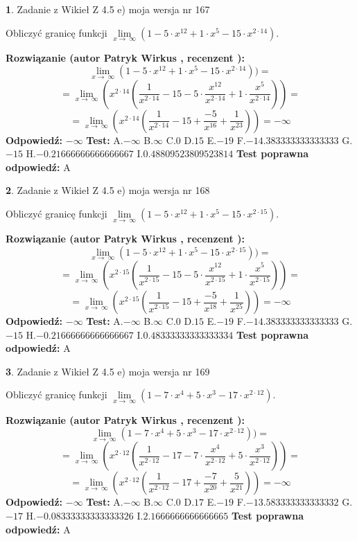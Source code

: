 \documentclass[12pt, a4paper]{article}
\theoremstyle{definition} %
\newtheorem{zad}{}
\newcommand{\zadStart}[1]{\begin{zad}#1\newline}
\newcommand{\zadStop}{\end{zad}}
\newcommand{\rozwStart}[2]{\noindent \textbf{Rozwiązanie (autor #1 , recenzent #2): }\newline}
\newcommand{\rozwStop}{\newline}
\newcommand{\odpStart}{\noindent \textbf{Odpowiedź:}\newline}
\newcommand{\odpStop}{\newline}
\newcommand{\testStart}{\noindent \textbf{Test:}\newline}
\newcommand{\testStop}{\newline}
\newcommand{\kluczStart}{\noindent \textbf{Test poprawna odpowiedź:}\newline}
\newcommand{\kluczStop}{\newline}
\begin{document}
\zadStart{Zadanie z Wikieł Z 4.5 e) moja wersja nr 167}


Obliczyć granicę funkcji  $\lim\limits_{x\to\ \infty}(1 - 5 \cdot x^{12}+1 \cdot x^{5}- 15 \cdot x^{2\cdot14})$.
\zadStop
\rozwStart{Patryk Wirkus}{}
$$\lim\limits_{x\to\ \infty}(1 - 5 \cdot x^{12}+1 \cdot x^{5}- 15 \cdot x^{2\cdot14}))=$$
$$=\lim\limits_{x\to\ \infty}(x^{2\cdot14}(\frac{1}{x^{2\cdot14}}-15 -5 \cdot \frac{x^{12}}{x^{2\cdot14}}+1 \cdot \frac{x^{5}}{x^{2\cdot14}}))=$$
$$=\lim\limits_{x\to\ \infty}(x^{2\cdot14}(\frac{1}{x^{2\cdot14}}-15 + \frac{-5}{x^{16}}+ \frac{1}{x^{23}}))=-\infty$$
\rozwStop
\odpStart
$-\infty$
\odpStop
\testStart
A.$-\infty$ B.$\infty$ C.$0$ D.$15$ E.$-19$
F.$-14.383333333333333$ G.$-15$
H.$-0.21666666666666667$
I.$0.48809523809523814$
\testStop
\kluczStart
A
\kluczStop



\zadStart{Zadanie z Wikieł Z 4.5 e) moja wersja nr 168}


Obliczyć granicę funkcji  $\lim\limits_{x\to\ \infty}(1 - 5 \cdot x^{12}+1 \cdot x^{5}- 15 \cdot x^{2\cdot15})$.
\zadStop
\rozwStart{Patryk Wirkus}{}
$$\lim\limits_{x\to\ \infty}(1 - 5 \cdot x^{12}+1 \cdot x^{5}- 15 \cdot x^{2\cdot15}))=$$
$$=\lim\limits_{x\to\ \infty}(x^{2\cdot15}(\frac{1}{x^{2\cdot15}}-15 -5 \cdot \frac{x^{12}}{x^{2\cdot15}}+1 \cdot \frac{x^{5}}{x^{2\cdot15}}))=$$
$$=\lim\limits_{x\to\ \infty}(x^{2\cdot15}(\frac{1}{x^{2\cdot15}}-15 + \frac{-5}{x^{18}}+ \frac{1}{x^{25}}))=-\infty$$
\rozwStop
\odpStart
$-\infty$
\odpStop
\testStart
A.$-\infty$ B.$\infty$ C.$0$ D.$15$ E.$-19$
F.$-14.383333333333333$ G.$-15$
H.$-0.21666666666666667$
I.$0.48333333333333334$
\testStop
\kluczStart
A
\kluczStop



\zadStart{Zadanie z Wikieł Z 4.5 e) moja wersja nr 169}


Obliczyć granicę funkcji  $\lim\limits_{x\to\ \infty}(1 - 7 \cdot x^{4}+5 \cdot x^{3}- 17 \cdot x^{2\cdot12})$.
\zadStop
\rozwStart{Patryk Wirkus}{}
$$\lim\limits_{x\to\ \infty}(1 - 7 \cdot x^{4}+5 \cdot x^{3}- 17 \cdot x^{2\cdot12}))=$$
$$=\lim\limits_{x\to\ \infty}(x^{2\cdot12}(\frac{1}{x^{2\cdot12}}-17 -7 \cdot \frac{x^{4}}{x^{2\cdot12}}+5 \cdot \frac{x^{3}}{x^{2\cdot12}}))=$$
$$=\lim\limits_{x\to\ \infty}(x^{2\cdot12}(\frac{1}{x^{2\cdot12}}-17 + \frac{-7}{x^{20}}+ \frac{5}{x^{21}}))=-\infty$$
\rozwStop
\odpStart
$-\infty$
\odpStop
\testStart
A.$-\infty$ B.$\infty$ C.$0$ D.$17$ E.$-19$
F.$-13.583333333333332$ G.$-17$
H.$-0.08333333333333326$
I.$2.1666666666666665$
\testStop
\kluczStart
A
\kluczStop
\end{document}
